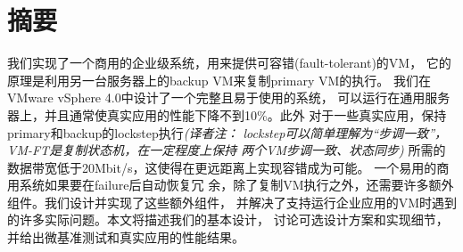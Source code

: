 \section*{摘要}

我们实现了一个商用的企业级系统，用来提供可容错(fault-tolerant)的VM，%
它的原理是利用另一台服务器上的backup VM来复制primary VM的执行。%
我们在VMware vSphere 4.0中设计了一个完整且易于使用的系统，%
可以运行在通用服务器上，并且通常使真实应用的性能下降不到10\%。此外%
对于一些真实应用，保持primary和backup的lockstep执行\emph{(译者注：
lockstep可以简单理解为“步调一致”，VM-FT是复制状态机，在一定程度上保持
两个VM步调一致、状态同步)}%
所需的数据带宽低于20Mbit/s，这使得在更远距离上实现容错成为可能。%
一个易用的商用系统如果要在failure后自动恢复冗%
余，除了复制VM执行之外，还需要许多额外组件。我们设计并实现了这些额外组件，%
并解决了支持运行企业应用的VM时遇到的许多实际问题。本文将描述我们的基本设计，%
讨论可选设计方案和实现细节，并给出微基准测试和真实应用的性能结果。
